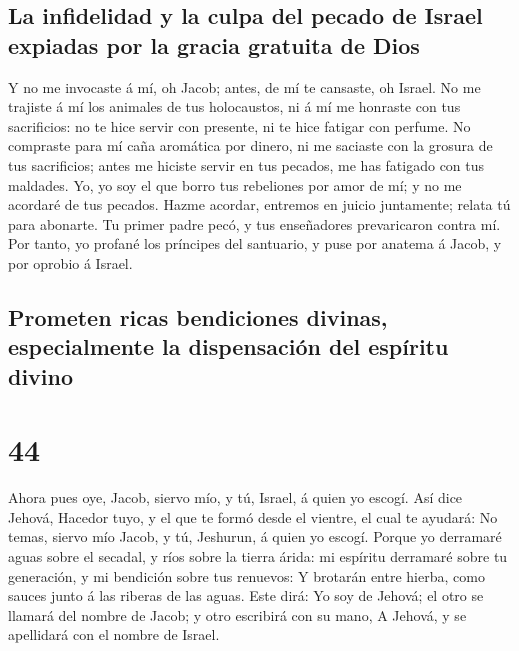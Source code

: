 \hypertarget{la-infidelidad-y-la-culpa-del-pecado-de-israel-expiadas-por-la-gracia-gratuita-de-dios}{%
\subsection{La infidelidad y la culpa del pecado de Israel expiadas por
la gracia gratuita de
Dios}\label{la-infidelidad-y-la-culpa-del-pecado-de-israel-expiadas-por-la-gracia-gratuita-de-dios}}

 Y no me invocaste á mí, oh Jacob; antes, de mí te
cansaste, oh Israel.  No me trajiste á mí los animales de
tus holocaustos, ni á mí me honraste con tus sacrificios: no te hice
servir con presente, ni te hice fatigar con perfume.  No
compraste para mí caña aromática por dinero, ni me saciaste con la
grosura de tus sacrificios; antes me hiciste servir en tus pecados, me
has fatigado con tus maldades.  Yo, yo soy el que borro
tus rebeliones por amor de mí; y no me acordaré de tus pecados.
 Hazme acordar, entremos en juicio juntamente; relata tú
para abonarte.  Tu primer padre pecó, y tus enseñadores
prevaricaron contra mí.  Por tanto, yo profané los
príncipes del santuario, y puse por anatema á Jacob, y por oprobio á
Israel.

\hypertarget{prometen-ricas-bendiciones-divinas-especialmente-la-dispensaciuxf3n-del-espuxedritu-divino}{%
\subsection{Prometen ricas bendiciones divinas, especialmente la
dispensación del espíritu
divino}\label{prometen-ricas-bendiciones-divinas-especialmente-la-dispensaciuxf3n-del-espuxedritu-divino}}

\hypertarget{section-43}{%
\section{44}\label{section-43}}

 Ahora pues oye, Jacob, siervo mío, y tú, Israel, á quien
yo escogí.  Así dice Jehová, Hacedor tuyo, y el que te
formó desde el vientre, el cual te ayudará: No temas, siervo mío Jacob,
y tú, Jeshurun, á quien yo escogí.  Porque yo derramaré
aguas sobre el secadal, y ríos sobre la tierra árida: mi espíritu
derramaré sobre tu generación, y mi bendición sobre tus renuevos:
 Y brotarán entre hierba, como sauces junto á las riberas
de las aguas.  Este dirá: Yo soy de Jehová; el otro se
llamará del nombre de Jacob; y otro escribirá con su mano, A Jehová, y
se apellidará con el nombre de Israel.

